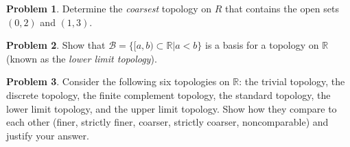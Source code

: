 \documentclass{amsart}
\newcommand{\+}[1]{\ensuremath{\mathbf{#1}}}
\newcommand{\R}{{\mathbb R}}
\theoremstyle{definition}
\newtheorem{prob}{Problem}
\begin{document}
\begin{prob}
 Determine the \emph{coarsest} topology on $R$ that contains the open sets
 $(0,2)$ and $(1,3)$.
\end{prob}

\begin{prob}
 Show that $\mathcal{B} = \{[a,b) \subset \R \vert a < b\}$
 is a basis for a topology on $\R$ (known as the \emph{lower limit topology}).
\end{prob}


\begin{prob}
 Consider the following six topologies on $\R$: the trivial topology, the discrete topology, the finite complement topology, the standard topology, the lower limit topology, and the upper limit topology.  Show how they compare to each other (finer, strictly finer, coarser, strictly coarser, noncomparable)
 and justify your answer.
\end{prob}
\end{document}
